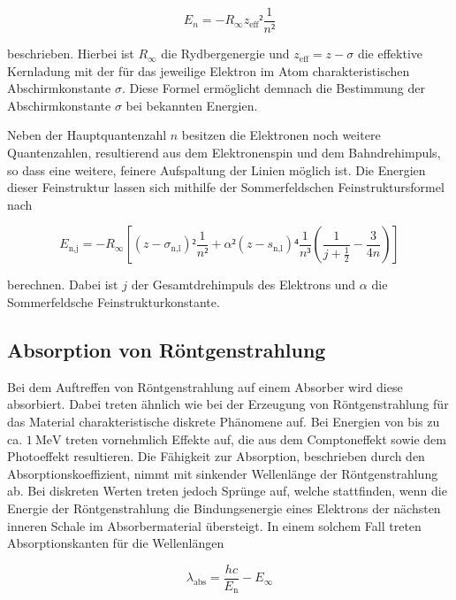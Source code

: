 \begin{equation}
E_n = -R_{\infty} z_\text{eff}² \frac{1}{n²}
\label{eqn:std}
\end{equation}

beschrieben. 
Hierbei ist $R_\infty$ die Rydbergenergie und $z_\text{eff} = z -\sigma$ die
effektive Kernladung mit der für das jeweilige Elektron im Atom charakteristischen
Abschirmkonstante $\sigma$.
Diese Formel ermöglicht demnach die Bestimmung der Abschirmkonstante $\sigma$
bei bekannten Energien. 

Neben der Hauptquantenzahl $n$ besitzen die Elektronen noch weitere Quantenzahlen,
resultierend aus dem Elektronenspin und dem Bahndrehimpuls, so dass eine weitere,
feinere Aufspaltung der Linien möglich ist. 
Die Energien dieser Feinstruktur lassen sich mithilfe der Sommerfeldschen 
Feinstruktursformel nach 

\begin{equation}
 E_{\text{n}, \text{j}} = -R_{\infty} \left[(z-\sigma_{\text{n}, \text{l}})²\frac{1}{n²}+\alpha²(z-s_{\text{n}, \text{l}})⁴\frac{1}{n³}\left(\frac{1}{j+\frac{1}{2}}-\frac{3}{4n}\right)\right]
\end{equation}

berechnen. Dabei ist $j$ der Gesamtdrehimpuls des Elektrons und $\alpha$ die 
Sommerfeldsche Feinstrukturkonstante. 

\subsection{Absorption von Röntgenstrahlung}

Bei dem Auftreffen von Röntgenstrahlung auf einem Absorber wird diese absorbiert. 
Dabei treten ähnlich wie bei der Erzeugung von Röntgenstrahlung für das Material
charakteristische diskrete Phänomene auf. 
Bei Energien von bis zu ca. $\SI{1}{\mega\electronvolt}$ treten vornehmlich 
Effekte auf, die aus dem Comptoneffekt sowie dem Photoeffekt resultieren. 
Die Fähigkeit zur Absorption, beschrieben durch den Absorptionskoeffizient, 
nimmt mit sinkender Wellenlänge der Röntgenstrahlung ab. 
Bei diskreten Werten treten jedoch Sprünge auf, welche stattfinden, wenn die Energie
der Röntgenstrahlung die Bindungsenergie eines Elektrons der nächsten inneren 
Schale im Absorbermaterial übersteigt. 
In einem solchem Fall treten Absorptionskanten für die Wellenlängen 

\begin{equation}
\lambda_\text{abs} = \frac{h c}{E_\text{n}} - E_\infty
\end{equation}

